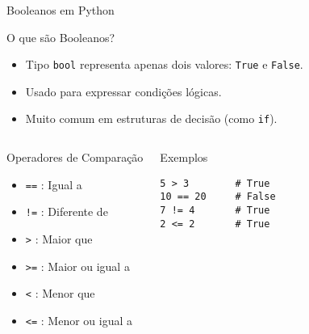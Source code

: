 \begin{frame}[fragile]{Booleanos em Python}

    \begin{block}{O que são Booleanos?}
        \begin{itemize}
            \item Tipo \texttt{bool} representa apenas dois valores: \texttt{True} e \texttt{False}.
            \item Usado para expressar condições lógicas.
            \item Muito comum em estruturas de decisão (como \texttt{if}).
        \end{itemize}
    \end{block}

    \vspace{0.5em}

    \begin{columns}[T]
        \begin{block}{Operadores de Comparação}
            \begin{itemize}
                \item \texttt{==} : Igual a
                \item \texttt{!=} : Diferente de
                \item \texttt{>}  : Maior que
                \item \texttt{>=} : Maior ou igual a
                \item \texttt{<}  : Menor que
                \item \texttt{<=} : Menor ou igual a
            \end{itemize}
        \end{block}

        \begin{block}{Exemplos}
            \begin{verbatim}
5 > 3        # True
10 == 20     # False
7 != 4       # True
2 <= 2       # True
\end{verbatim}
        \end{block}
    \end{columns}

\end{frame}

